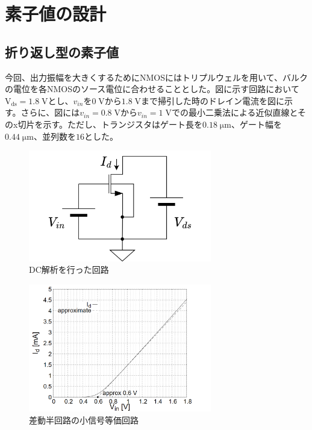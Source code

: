 \documentclass[twocolumn]{jsarticle}
\begin{document}
\section{素子値の設計}
        \subsection{折り返し型の素子値}
        今回、出力振幅を大きくするためにNMOSにはトリプルウェルを用いて、バルクの電位を各NMOSのソース電位に合わせることとした。図に示す回路において$\mathrm{V_{ds}}=1.8\;\mathrm{V}$とし、$v_{in}$を$0\;\mathrm{V}$から$1.8\;\mathrm{V}$まで掃引した時のドレイン電流を図に示す。さらに、図には$v_{in}=0.8\;\mathrm{V}$から$v_{in}=1\;\mathrm{V}$での最小二乗法による近似直線とそのx切片を示す。ただし、トランジスタはゲート長を$0.18\;\mathrm{\mu m}$、ゲート幅を$0.44\;\mathrm{\mu m}$、並列数を$16$とした。
        \begin{figure}[H]
            \begin{center}
                \includegraphics*[width = 80mm]{figures/nmos_unit_circuit.png}
                \caption{DC解析を行った回路}
                \label{fig:nmos_unit_circuit}
            \end{center}
        \end{figure}
        \begin{figure}[H]
            \begin{center}
                \includegraphics*[width = 80mm]{figures/nmos_unit.PNG}
                \caption{差動半回路の小信号等価回路}
                \label{fig:nmos_unit}
            \end{center}
        \end{figure}
\end{document}
